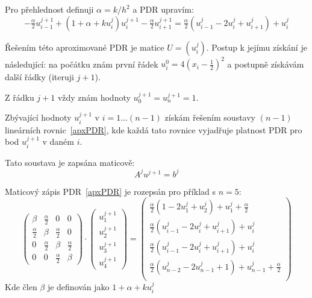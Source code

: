 \documentclass[a4paper,12pt]{article}
\begin{document}
Pro přehlednost definuji $\alpha = k / h^2$ a PDR upravím:
\begin{equation}
\label{apxPDR}
	-\tfrac{\alpha}{2} u_{i-1}^{j+1} +
	(1 + \alpha + k u_i^j) u_i^{j+1} -
	\tfrac{\alpha}{2} u_{i+1}^{j+1} =
	\tfrac{\alpha}{2} \left( u_{i-1}^j - 2 u_i^j + u_{i+1}^j \right) + u_i^j
\end{equation}

Řešením této aproximované PDR je matice $U = \left( u_i^j \right)$.
Postup k jejímu získání je následující: na počátku znám první řádek $u_i^0 = 4(x_i - \tfrac{1}{2})^2$ a postupně získávám další řádky (iteruji $j+1$).

Z řádku $j+1$ vždy znám hodnoty $u_0^{j+1} = u_n^{j+1} = 1$.

Zbývající hodnoty $u_i^{j+1}$ v $i=1...(n-1)$ získám řešením soustavy $(n-1)$ lineárních rovnic~\ref{apxPDR}, kde každá tato rovnice vyjadřuje platnost PDR pro bod $u_i^{j+1}$ v daném $i$.

Tato soustava je zapsána maticově:
\begin{equation}
	A^j u^{j+1} = b^j
\end{equation}

Maticový zápis PDR~\ref{apxPDR} je rozepsán pro příklad s $n=5$:
\begin{equation}
\begin{pmatrix}
	\beta & \tfrac{\alpha}{2} & 0 & 0 \\
	\tfrac{\alpha}{2} & \beta & \tfrac{\alpha}{2} & 0 \\
	0 & \tfrac{\alpha}{2} & \beta & \tfrac{\alpha}{2} \\
	0 & 0 & \tfrac{\alpha}{2} & \beta
\end{pmatrix}
\cdot
\begin{pmatrix}
	u_1^{j+1} \\ u_2^{j+1} \\ u_3^{j+1} \\ u_4^{j+1}
\end{pmatrix}
=
\begin{pmatrix}
	\tfrac{\alpha}{2} \left( 1 - 2 u_1^j + u_2^j \right) + u_1^j + \tfrac{\alpha}{2} \\
	\tfrac{\alpha}{2} \left( u_{i-1}^j - 2 u_i^j + u_{i+1}^j \right) + u_i^j \\
	\tfrac{\alpha}{2} \left( u_{i-1}^j - 2 u_i^j + u_{i+1}^j \right) + u_i^j \\
	\tfrac{\alpha}{2} \left( u_{n-2}^j - 2 u_{n-1}^j + 1 \right) + u_{n-1}^j + \tfrac{\alpha}{2} \\
\end{pmatrix}
\end{equation}
Kde člen $\beta$ je definován jako $1 + \alpha + k u_i^j$
\end{document}
